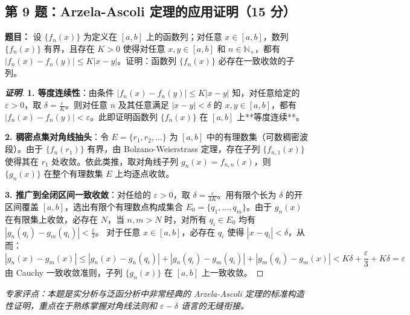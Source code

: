 \documentclass[11pt,a4paper]{article}
\begin{document}
	\begin{tcolorbox}[examstyle]
		\subsection*{第 9 题：Arzela-Ascoli 定理的应用证明（15 分）}
		\textbf{题目：} 设 $\{f_n(x)\}$ 为定义在 $[a,b]$ 上的函数列；对任意 $x \in [a,b]$，数列 $\{f_n(x)\}$ 有界，且存在 $K > 0$ 使得对任意 $x,y \in [a,b]$ 和 $n \in \mathbb{N}_+$，都有 $|f_n(x) - f_n(y)| \le K|x - y|$。证明：函数列 $\{f_n(x)\}$ 必存在一致收敛的子列。
		
		\begin{proof}[\textbf{证明}]
			\item \textbf{1. 等度连续性}：由条件 $|f_n(x) - f_n(y)| \le K|x - y|$ 知，对任意给定的 $\varepsilon > 0$，取 $\delta = \frac{\varepsilon}{K}$。则对任意 $n$ 及其任意满足 $|x-y| < \delta$ 的 $x,y \in [a,b]$，都有 $|f_n(x) - f_n(y)| < \varepsilon$。此即证明函数列 $\{f_n(x)\}$ 在 $[a,b]$ 上**等度连续**。
			
			\item \textbf{2. 稠密点集对角线抽头}：令 $E = \{r_1, r_2, \dots\}$ 为 $[a,b]$ 中的有理数集（可数稠密波段）。由于 $\{f_n(r_1)\}$ 有界，由 Bolzano-Weierstrass 定理，存在子列 $\{f_{n,1}(x)\}$ 使得其在 $r_1$ 处收敛。依此类推，取对角线子列 $g_n(x) = f_{n,n}(x)$，则 $\{g_n(x)\}$ 在整个有理数集 $E$ 上均逐点收敛。
			
			\item \textbf{3. 推广到全闭区间一致收敛}：对任给的 $\varepsilon > 0$，取 $\delta = \frac{\varepsilon}{3K}$。用有限个长为 $\delta$ 的开区间覆盖 $[a,b]$，选出有限个有理数点构成集合 $E_0 = \{q_1, \dots, q_m\}$。由于 $g_n(x)$ 在有限集上收敛，必存在 $N$，当 $n,m > N$ 时，对所有 $q_i \in E_0$ 均有 $|g_n(q_i) - g_m(q_i)| < \frac{\varepsilon}{3}$。
			对于任意 $x \in [a,b]$，必存在 $q_i$ 使得 $|x - q_i| < \delta$，从而：
			$$ |g_n(x) - g_m(x)| \le |g_n(x) - g_n(q_i)| + |g_n(q_i) - g_m(q_i)| + |g_m(q_i) - g_m(x)| < K\delta + \frac{\varepsilon}{3} + K\delta = \varepsilon $$
			由 Cauchy 一致收敛准则，子列 $\{g_n(x)\}$ 在 $[a,b]$ 上一致收敛。
		\end{proof}
		\tcblower
		\textit{专家评点：本题是实分析与泛函分析中非常经典的 Arzela-Ascoli 定理的标准构造性证明，重点在于熟练掌握对角线法则和 $\varepsilon-\delta$ 语言的无缝衔接。}
	\end{tcolorbox}
	
\end{document}
